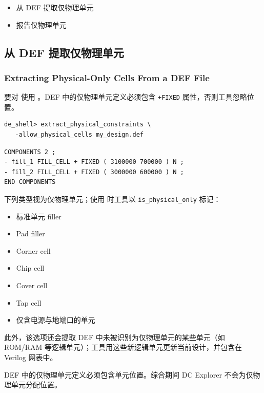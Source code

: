 \begin{seeAlsoBox}
\begin{itemize}
  \item 从 DEF 提取仅物理单元
  \item 报告仅物理单元
\end{itemize}
\end{seeAlsoBox}

\subsection{从 DEF 提取仅物理单元}
\subsubsection*{Extracting Physical-Only Cells From a DEF File}

要对  使用 。DEF 中的仅物理单元定义必须包含 \texttt{+FIXED} 属性，否则工具忽略位置。

\begin{lstlisting}
de_shell> extract_physical_constraints \
   -allow_physical_cells my_design.def
\end{lstlisting}

\begin{lstlisting}[caption={两个 filler 单元的 DEF 定义}]
COMPONENTS 2 ;
- fill_1 FILL_CELL + FIXED ( 3100000 700000 ) N ;
- fill_2 FILL_CELL + FIXED ( 3000000 600000 ) N ;
END COMPONENTS
\end{lstlisting}

下列类型视为仅物理单元；使用  时工具以 \texttt{is\_physical\_only} 标记：
\begin{itemize}
  \item 标准单元 filler
  \item Pad filler
  \item Corner cell
  \item Chip cell
  \item Cover cell
  \item Tap cell
  \item 仅含电源与地端口的单元
\end{itemize}

此外，该选项还会提取 DEF 中未被识别为仅物理单元的某些单元（如 ROM/RAM 等逻辑单元）；工具用这些新逻辑单元更新当前设计，并包含在 Verilog 网表中。

\begin{noteBox}
DEF 中的仅物理单元定义必须包含单元位置。综合期间 DC Explorer 不会为仅物理单元分配位置。
\end{noteBox}

